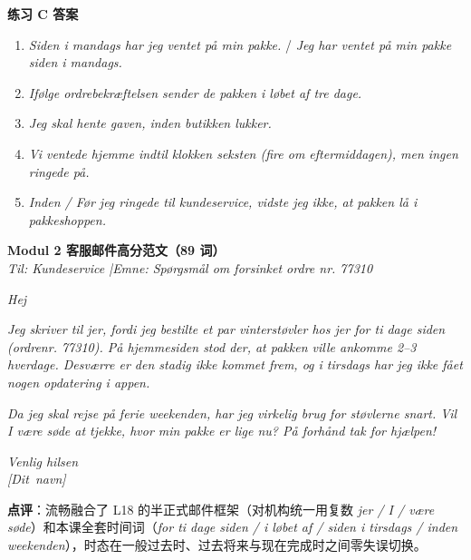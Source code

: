 \begin{answerbox}
\textbf{练习 C 答案}
\begin{enumerate}
  \item \textit{Siden i mandags har jeg ventet på min pakke.} / \textit{Jeg har ventet på min pakke siden i mandags.}
  \item \textit{Ifølge ordrebekræftelsen sender de pakken i løbet af tre dage.}
  \item \textit{Jeg skal hente gaven, inden butikken lukker.}
  \item \textit{Vi ventede hjemme indtil klokken seksten (fire om eftermiddagen), men ingen ringede på.}
  \item \textit{Inden / Før jeg ringede til kundeservice, vidste jeg ikke, at pakken lå i pakkeshoppen.}
\end{enumerate}

\textbf{Modul 2 客服邮件高分范文（89 词）}\\
\textit{Til: Kundeservice \quad|\quad Emne: Spørgsmål om forsinket ordre nr. 77310}

\textit{Hej}

\textit{Jeg skriver til jer, fordi jeg bestilte et par vinterstøvler hos jer for ti dage siden (ordrenr. 77310). På hjemmesiden stod der, at pakken ville ankomme  2--3 hverdage. Desværre er den stadig ikke kommet frem, og  i tirsdags har jeg ikke fået nogen opdatering i appen.}

\textit{Da jeg skal rejse på ferie  weekenden, har jeg virkelig brug for støvlerne snart. Vil I være søde at tjekke, hvor min pakke er lige nu? På forhånd tak for hjælpen!}

\textit{Venlig hilsen\\
\mbox{[Dit navn]}}

\small\textbf{点评}：流畅融合了 L18 的半正式邮件框架（对机构统一用复数 \textit{jer / I / være søde}）和本课全套时间词（\textit{for ti dage siden / i løbet af / siden i tirsdags / inden weekenden}），时态在一般过去时、过去将来与现在完成时之间零失误切换。
\end{answerbox}
